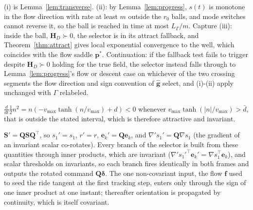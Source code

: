 \documentclass[lettersize,journal]{IEEEtran}
\begin{document}
\begin{IEEEproof}
(i) is Lemma~\ref{lem:transverse}. (ii): by Lemma~\ref{lem:progress},
$s(t)$ is monotone in the flow direction with rate at least $m$ outside
the $r_0$ balls, and mode switches cannot reverse it, so the ball is
reached in time at most $L_\Gamma/m$. Capture (iii): inside the ball,
$\mathbf{H}_D \succ 0$, the selector is in its attract fallback, and
Theorem~\ref{thm:attract} gives local exponential convergence to the
well, which coincides with the flow saddle $\mathbf{p}^*$. Continuation:
if the fallback test fails to trigger despite $\mathbf{H}_D \succ 0$
holding for the true field, the selector instead falls through to
Lemma~\ref{lem:progress}'s flow or descent case on whichever of the two
crossing segments the flow direction and sign convention of
$\hat{\mathbf{g}}$ select, and (i)-(ii) apply unchanged with $\Gamma$
relabeled.
\end{IEEEproof}

\begin{IEEEproof}
$\tfrac{d}{dt}\tfrac{1}{2}n^2 = n(-v_{\max}
\tanh(n/v_{\max}) + d) < 0$ whenever $v_{\max}\tanh(|n|/v_{\max}) >
\bar{d}$, that is outside the stated interval, which is therefore
attractive and invariant.
\end{IEEEproof}

\begin{IEEEproof}
$\mathbf{S}' = \mathbf{Q}\mathbf{S}\mathbf{Q}^\top$, so $s_1' = s_1$,
$r' = r$, $\mathbf{e}_k' = \mathbf{Q}\mathbf{e}_k$, and $\nabla' s_1' =
\mathbf{Q}\nabla s_1$ (the gradient of an invariant scalar co-rotates).
Every branch of the selector is built from these quantities through
inner products, which are invariant
($\nabla' s_1'^\top \mathbf{e}_k' = \nabla s_1^\top \mathbf{e}_k$), and
scalar thresholds on invariants, so each branch fires identically in
both frames and outputs the rotated command
$\mathbf{Q}\boldsymbol{\delta}$. The one non-covariant input, the flow
$\mathbf{f}$ used to seed the ride tangent at the first tracking step,
enters only through the sign of one inner product at one instant;
thereafter orientation is propagated by continuity, which is itself
covariant.
\end{IEEEproof}
\end{document}
